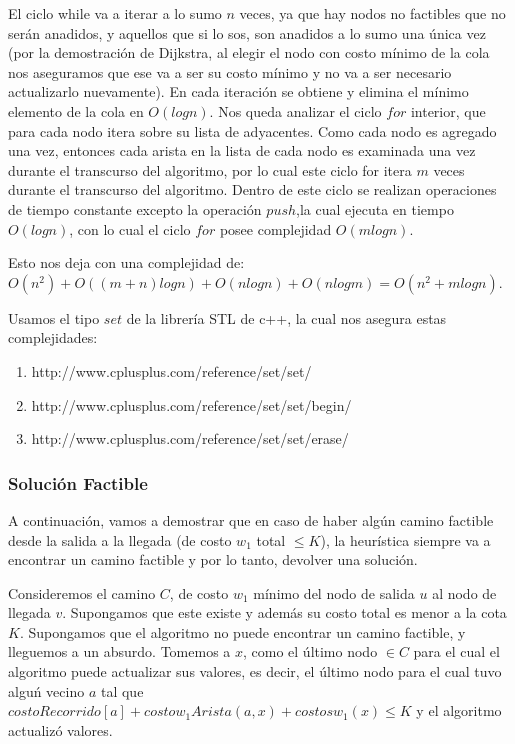 \vspace{2mm}

El ciclo while va a iterar a lo sumo $n$ veces, ya que hay nodos no factibles que no ser\'an anadidos, y aquellos que si lo sos, son anadidos a lo sumo una \'unica vez (por la demostraci\'on de Dijkstra, al elegir el nodo con costo m\'inimo de la cola nos aseguramos que ese va a ser su costo m\'inimo y no va a ser necesario actualizarlo nuevamente). En cada iteraci\'on se obtiene y elimina el m\'inimo elemento de la cola en $O(logn)$. Nos queda analizar el ciclo $for$ interior, que para cada nodo itera sobre su lista de adyacentes. Como cada nodo es agregado una vez, entonces cada arista en la lista de cada nodo es examinada una vez durante el transcurso del algoritmo, por lo cual este ciclo for itera $m$ veces durante el transcurso del algoritmo. Dentro de este ciclo se realizan operaciones de tiempo constante excepto la operaci\'on $push$,la cual ejecuta en tiempo $O(logn)$, con lo cual el ciclo $for$ posee complejidad $O(mlogn)$.

\vspace{2mm}

Esto nos deja con una complejidad de: $O(n^2) + O((m+n)log n) + O(n log n) + O(n log m) = O(n^2 + m log n)$.

\vspace{2mm}

Usamos el tipo $set$ de la librer\'ia STL de c++, la cual nos asegura estas complejidades:
\begin{enumerate}
\item http://www.cplusplus.com/reference/set/set/
\item http://www.cplusplus.com/reference/set/set/begin/
\item http://www.cplusplus.com/reference/set/set/erase/
\end{enumerate}

\subsubsection{Soluci\'on Factible}

A continuaci\'on, vamos a demostrar que en caso de haber alg\'un camino factible desde la salida a la llegada (de costo $w_1$ total $\leq K$), la heur\'istica siempre va a encontrar un camino factible y por lo tanto, devolver una soluci\'on.

\vspace{2mm}

Consideremos el camino $C$, de costo $w_1$ m\'inimo del nodo de salida $u$ al nodo de llegada $v$. Supongamos que este existe y adem\'as su costo total es menor a la cota $K$. Supongamos que el algoritmo no puede encontrar un camino factible, y lleguemos a un absurdo. Tomemos a $x$, como el \'ultimo nodo $\in C$ para el cual el algoritmo puede actualizar sus valores, es decir, el \'ultimo nodo para el cual tuvo algu\'n vecino $a$ tal que $costoRecorrido[a] + costow_1Arista(a,x) + costosw_1(x)  \leq K $ y el algoritmo actualiz\'o valores. 

